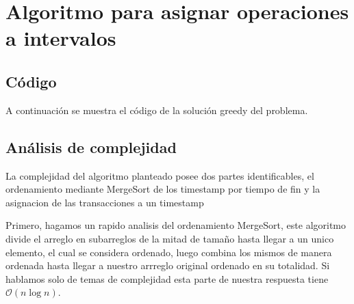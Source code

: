 \section{Algoritmo para asignar operaciones a intervalos}

\subsection{Código}


A continuación se muestra el código de la solución greedy del problema. 





% 




\subsection{Análisis de complejidad}

La complejidad del algoritmo planteado posee dos partes identificables, el ordenamiento mediante MergeSort de los timestamp por tiempo de fin y la asignacion de las transacciones a un timestamp

Primero, hagamos un rapido analisis del ordenamiento MergeSort, este algoritmo divide el arreglo en subarreglos de la mitad de tamaño hasta llegar a un unico elemento, el cual se considera ordenado, luego combina los mismos de manera ordenada hasta llegar a nuestro arrreglo original ordenado en su totalidad. Si hablamos solo de temas de complejidad esta parte de nuestra respuesta tiene $\mathcal{O}\left(n \log n\right)$.

